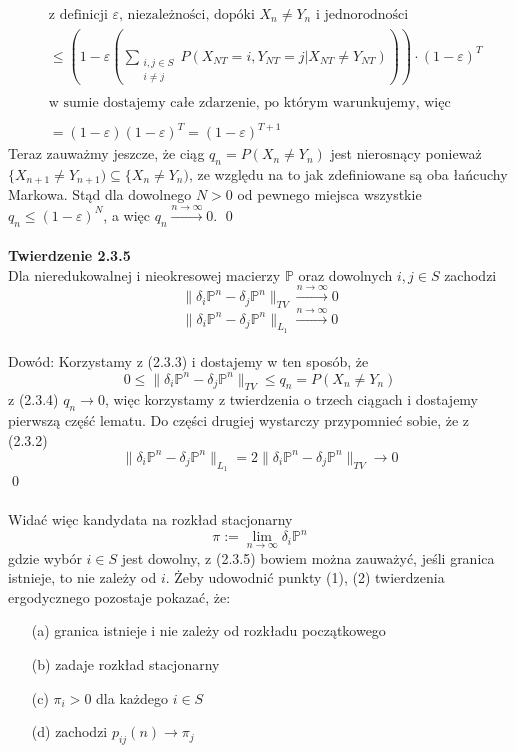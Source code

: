 \documentclass[a4paper]{article}
\begin{document}
    \begin{align*}
    &\text{z definicji $\varepsilon$, niezależności, dopóki $X_n \neq Y_n$ i jednorodności}\\
    &\leq \left( 1 - \varepsilon \left(\sum_{\substack{i,j \in S\\i\neq j}} P(X_{NT} = i, Y_{NT} = j | X_{NT} \neq Y_{NT})\right)\right)\cdot (1- \varepsilon)^T\\\\
    &\text{w sumie dostajemy całe zdarzenie, po którym warunkujemy, więc}
    \\\\
    &= (1-\varepsilon)(1-\varepsilon)^T = (1- \varepsilon)^{T+1}
\end{align*}
Teraz zauważmy jeszcze, że ciąg $q_n = P(X_n \neq Y_n)$ jest nierosnący ponieważ $\{X_{n+1} \neq Y_{n+1}) \subseteq \{X_{n} \neq Y_{n})$, ze względu na to jak zdefiniowane są oba łańcuchy Markowa. Stąd dla dowolnego $N > 0$ od pewnego miejsca wszystkie $q_n \leq (1-\varepsilon)^N$, a więc $q_n \xrightarrow{n \to \infty} 0$. \qed
\\\\
\textbf{Twierdzenie 2.3.5}\\
Dla nieredukowalnej i nieokresowej macierzy $\mathbb{P}$ oraz dowolnych $i, j \in S$ zachodzi $$\|\delta_i\mathbb{P}^n - \delta_j\mathbb{P}^n\|_{TV} \xrightarrow{n \to \infty} 0$$ $$\|\delta_i\mathbb{P}^n - \delta_j\mathbb{P}^n\|_{L_1} \xrightarrow{n \to \infty} 0$$
\\Dowód: Korzystamy z (2.3.3) i dostajemy w ten sposób, że $$0 \leq \|\delta_i\mathbb{P}^n - \delta_j\mathbb{P}^n\|_{TV} \leq q_n = P(X_n \neq Y_n)$$
z (2.3.4) $q_n \to 0$, więc korzystamy z twierdzenia o trzech ciągach i dostajemy pierwszą część lematu. Do części drugiej wystarczy przypomnieć sobie, że z (2.3.2) $$\|\delta_i\mathbb{P}^n - \delta_j\mathbb{P}^n\|_{L_1} = 2\|\delta_i\mathbb{P}^n - \delta_j\mathbb{P}^n\|_{TV} \to 0$$\qed \\
\\
Widać więc kandydata na rozkład stacjonarny $$\pi := \lim\limits_{n \to \infty} \delta_i\mathbb{P}^n$$ gdzie wybór $i \in S$ jest dowolny, z (2.3.5) bowiem można zauważyć, jeśli granica istnieje, to nie zależy od $i$. Żeby udowodnić punkty (1), (2) twierdzenia ergodycznego pozostaje pokazać, że:
\begin{enumerate}
	\item[(a)] granica istnieje i nie zależy od rozkładu początkowego
	\item[(b)] zadaje rozkład stacjonarny
	\item[(c)] $\pi_i > 0$ dla każdego $i \in S$
	\item[(d)] zachodzi $p_{ij}(n) \to \pi_j$
\end{enumerate}
\end{document}
